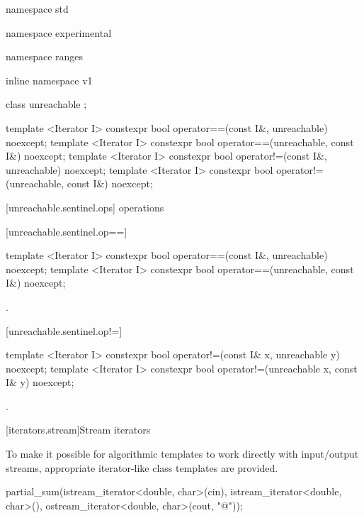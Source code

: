\begin{codeblock}
namespace std { namespace experimental { namespace ranges { inline namespace v1 {
  class unreachable { };

  template <Iterator I>
    constexpr bool operator==(const I&, unreachable) noexcept;
  template <Iterator I>
    constexpr bool operator==(unreachable, const I&) noexcept;
  template <Iterator I>
    constexpr bool operator!=(const I&, unreachable) noexcept;
  template <Iterator I>
    constexpr bool operator!=(unreachable, const I&) noexcept;
}}}}
\end{codeblock}

[unreachable.sentinel.ops]{ operations}

[unreachable.sentinel.op==]{}

%
%
\begin{itemdecl}
template <Iterator I>
  constexpr bool operator==(const I&, unreachable) noexcept;
template <Iterator I>
  constexpr bool operator==(unreachable, const I&) noexcept;
\end{itemdecl}

\begin{itemdescr}
\pnum
\returns {}.
\end{itemdescr}

[unreachable.sentinel.op!=]{}

%
%
\begin{itemdecl}
template <Iterator I>
  constexpr bool operator!=(const I& x, unreachable y) noexcept;
template <Iterator I>
  constexpr bool operator!=(unreachable x, const I& y) noexcept;
\end{itemdecl}

\begin{itemdescr}
\pnum
\returns
{}.
\end{itemdescr}

[iterators.stream]{Stream iterators}

\pnum
To make it possible for algorithmic templates to work directly with input/output streams, appropriate
iterator-like
class templates
are provided.

\enterexample
\begin{codeblock}
partial_sum(istream_iterator<double, char>(cin),
  istream_iterator<double, char>(),
  ostream_iterator<double, char>(cout, "@\textbackslash@n"));
\end{codeblock}

